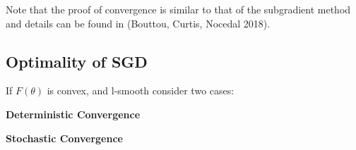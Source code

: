 Note that the proof of convergence is similar to that of the subgradient method and details can be found in (Bouttou, Curtis, Nocedal 2018). 


\subsection{Optimality of SGD}
If $F(\theta)$ is convex, and l-smooth consider two cases:

\noindent \textbf{Deterministic Convergence} 

\noindent \textbf{Stochastic Convergence}